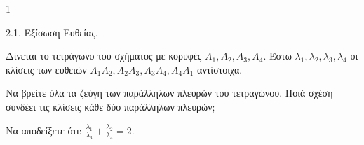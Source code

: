 \begin{ylh}{1}
    \item 2.1. Εξίσωση Ευθείας.
\end{ylh}
\begin{figure} %
    \centering
\end{figure}
Δίνεται το τετράγωνο του σχήματος με κορυφές $A_1, A_2, A_3, A_4$. Έστω $\lambda_1, \lambda_2, \lambda_3, \lambda_4$ οι κλίσεις των ευθειών $A_1A_2, A_2A_3, A_3A_4, A_4A_1$ αντίστοιχα.

\begin{alist}
\item Να βρείτε όλα τα ζεύγη των παράλληλων πλευρών του τετραγώνου. Ποιά σχέση συνδέει τις κλίσεις κάθε δύο παράλληλων πλευρών; 
\item Να αποδείξετε ότι: $\frac{\lambda_1}{\lambda_3} + \frac{\lambda_2}{\lambda_4} = 2$. 
\end{alist}